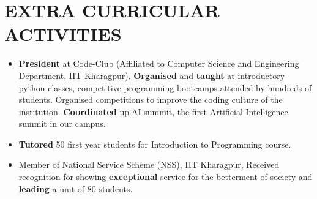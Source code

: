 \documentclass[paper=a4,fontsize=10pt]{scrartcl} %
\newcommand{\NewPart}[1]{\section*{\uppercase{#1}}}
\begin{document}
\NewPart{Extra Curricular Activities}{
\begin{itemize}[noitemsep]
  \item \textbf{President} at Code-Club (Affiliated to Computer Science and Engineering Department, IIT Kharagpur). \textbf{Organised} and \textbf{taught} at introductory python classes, competitive programming bootcamps attended by hundreds of students. Organised competitions to improve the coding culture of the institution. \textbf{Coordinated} up.AI summit, the first Artificial Intelligence summit in our campus.
  \item \textbf{Tutored} 50 first year students for Introduction to Programming course.
  \item Member of National Service Scheme (NSS), IIT Kharagpur, Received recognition for showing \textbf{exceptional} service for the betterment of society and \textbf{leading} a unit of 80 students.

\end{itemize}
}
\end{document}
